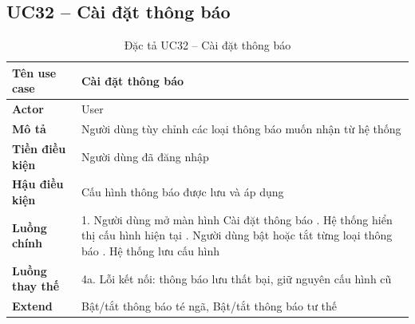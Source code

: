 \subsection*{UC32 -- Cài đặt thông báo}
\begin{table}[H]
    \captionsetup{justification=raggedright, singlelinecheck=false}
    \caption{Đặc tả UC32 -- Cài đặt thông báo}
\centering
\begin{tabular}{|p{3.5cm}|p{10cm}|}
\hline
\textbf{Tên use case} & Cài đặt thông báo \\
\hline
\textbf{Actor} & User \\
\hline
\textbf{Mô tả} & Người dùng tùy chỉnh các loại thông báo
  muốn nhận từ hệ thống \\
\hline
\textbf{Tiền điều kiện} & Người dùng đã đăng nhập \\
\hline
\textbf{Hậu điều kiện} & Cấu hình thông báo được lưu
  và áp dụng \\
\hline
\textbf{Luồng chính} &
  1. Người dùng mở màn hình Cài đặt thông báo \newline
  2. Hệ thống hiển thị cấu hình hiện tại \newline
  3. Người dùng bật hoặc tắt từng loại thông báo \newline
  4. Hệ thống lưu cấu hình \\
\hline
\textbf{Luồng thay thế} &
  4a. Lỗi kết nối: thông báo lưu thất bại,
  giữ nguyên cấu hình cũ \\
\hline
\textbf{Extend} & Bật/tắt thông báo té ngã,
  Bật/tắt thông báo tư thế \\
\hline
\end{tabular}

\end{table}

